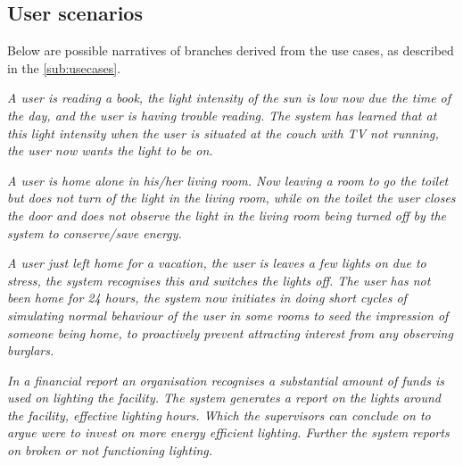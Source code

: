\subsection{User scenarios}\label{sub:userscenarios}

Below are possible narratives of branches derived from the use cases, as described in the \cref{sub:usecases}.

\textit{A user is reading a book, the light intensity of the sun is low now due the time of the day, and the user is having trouble reading. The system has learned that at this light intensity when the user is situated at the couch with TV not running, the user now wants the light to be on.}

\textit{A user is home alone in his/her living room. Now leaving a room to go the toilet but does not turn of the light in the living room, while on the toilet the user closes the door and does not observe the light in the living room being turned off by the system to conserve/save energy.}

\textit{A user just left home for a vacation, the user is leaves a few lights on due to stress, the system recognises this and switches the lights off. The user has not been home for 24 hours, the system now initiates in doing short cycles of simulating normal behaviour of the user in some rooms to seed the impression of someone being home, to proactively prevent attracting interest from any observing burglars.}

\textit{In a financial report an organisation recognises a substantial amount of funds is used on lighting the facility. The system generates a report on the lights around the facility, effective lighting hours. Which the supervisors can conclude on to argue were to invest on more energy efficient lighting. Further the system reports on broken or not functioning lighting.}


